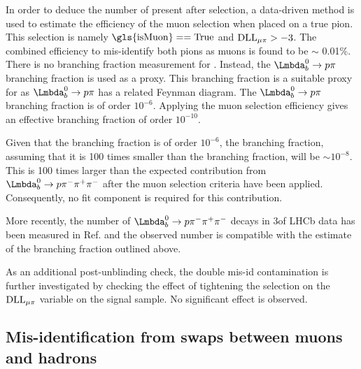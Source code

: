 In order to deduce the number of \Lb\to\proton\pim\pip\pim present after selection, a data-driven method is used to estimate the efficiency of the muon selection when placed on a true pion. This selection is namely $\mathrm{\gls{isMuon}==True}$ and $\mathrm{DLL}_{{\mu}\pi}>-3$. The combined efficiency to mis-identify both pions as muons is found to be $\sim$ 0.01\%. There is no branching fraction measurement for \Lb\to\proton\pim\pip\pim. Instead, the $\Lb\to\proton\pi$ branching fraction is used as a proxy. This branching fraction is a suitable proxy for \Lb\to\proton\pim\pip\pim as $\Lb\to\proton\pi$ has a related Feynman diagram.  The $\Lb\to\proton\pi$ branching fraction is of order $10^{-6}$. Applying the muon selection efficiency gives an effective branching fraction of order $10^{-10}$.


Given that the \Lbpijpsi branching fraction is of order $10^{-6}$, the \Lbpi branching fraction, assuming that it is 100 times smaller than the \Lbpijpsi branching fraction, will be  $\sim 10^{-8}$. This is 100 times larger than the expected contribution from $\Lb\to\proton\pim\pip\pim$ after the muon selection criteria have been applied. Consequently, no fit component is required for this \Lb\to\proton\pim\pip\pim contribution.

More recently, the number of $\Lb\to\proton\pim\pip\pim$ decays in 3\invfb of LHCb data has been measured in Ref.\cite{Aaij:2016cla} and the observed number is compatible with the estimate of the branching fraction outlined above.

As an additional post-unblinding check, the double mis-id contamination is further investigated by checking the effect of tightening the selection on the $\mathrm{DLL}_{{\mu}\pi}$ variable on the signal sample. No significant effect is observed.


\subsection{Mis-identification from swaps between muons and hadrons}
\label{sec:mismuon}

